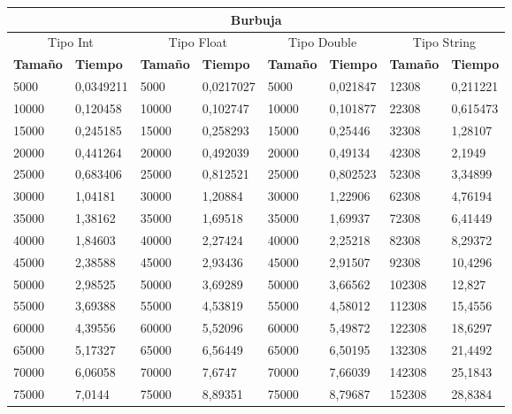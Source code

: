 \documentclass[11pt,openany]{book}
\begin{document}
\begin{table}[!ht]
    \centering
    \small
    \begin{tabular}{|l|l|l|l|l|l|l|l|}
    \hline
    \multicolumn{8}{|c|}{\cellcolor{blue!20}\textbf{Burbuja}} \\ \hline
    \multicolumn{2}{|c|}{\cellcolor{gray!20}Tipo Int} & \multicolumn{2}{c|}{\cellcolor{gray!20}Tipo Float} & \multicolumn{2}{c|}{\cellcolor{gray!20}Tipo Double} & \multicolumn{2}{c|}{\cellcolor{gray!20}Tipo String}\\ \hline
        \textbf{Tamaño} & \textbf{Tiempo} & \textbf{Tamaño} & \textbf{Tiempo} & \textbf{Tamaño} & \textbf{Tiempo} & \textbf{Tamaño} & \textbf{Tiempo} \\ \hline
        5000 & 0,0349211 & 5000 & 0,0217027 & 5000 & 0,021847 & 12308 & 0,211221 \\ \hline
        10000 & 0,120458 & 10000 & 0,102747 & 10000 & 0,101877 & 22308 & 0,615473 \\ \hline
        15000 & 0,245185 & 15000 & 0,258293 & 15000 & 0,25446 & 32308 & 1,28107 \\ \hline
        20000 & 0,441264 & 20000 & 0,492039 & 20000 & 0,49134 & 42308 & 2,1949 \\ \hline
        25000 & 0,683406 & 25000 & 0,812521 & 25000 & 0,802523 & 52308 & 3,34899 \\ \hline
        30000 & 1,04181 & 30000 & 1,20884 & 30000 & 1,22906 & 62308 & 4,76194 \\ \hline
        35000 & 1,38162 & 35000 & 1,69518 & 35000 & 1,69937 & 72308 & 6,41449 \\ \hline
        40000 & 1,84603 & 40000 & 2,27424 & 40000 & 2,25218 & 82308 & 8,29372 \\ \hline
        45000 & 2,38588 & 45000 & 2,93436 & 45000 & 2,91507 & 92308 & 10,4296 \\ \hline
        50000 & 2,98525 & 50000 & 3,69289 & 50000 & 3,66562 & 102308 & 12,827 \\ \hline
        55000 & 3,69388 & 55000 & 4,53819 & 55000 & 4,58012 & 112308 & 15,4556 \\ \hline
        60000 & 4,39556 & 60000 & 5,52096 & 60000 & 5,49872 & 122308 & 18,6297 \\ \hline
        65000 & 5,17327 & 65000 & 6,56449 & 65000 & 6,50195 & 132308 & 21,4492 \\ \hline
        70000 & 6,06058 & 70000 & 7,6747 & 70000 & 7,66039 & 142308 & 25,1843 \\ \hline
        75000 & 7,0144 & 75000 & 8,89351 & 75000 & 8,79687 & 152308 & 28,8384 \\ \hline

\end{tabular}
\end{table}
\end{document}
